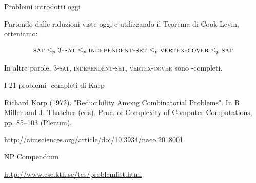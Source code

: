 \begin{frame}{Problemi introdotti oggi}

Partendo dalle riduzioni viste oggi e utilizzando il Teorema di Cook-Levin,
otteniamo:

\[
  \textsc{sat} \leq_p \textsc{3-sat} \leq_p \textsc{independent-set} \leq_p \textsc{vertex-cover} \leq_p \textsc{sat}
\]

\bigskip
In altre parole, \textsc{3-sat}, \textsc{independent-set}, \textsc{vertex-cover}
sono \NP-completi.

\end{frame}


\begin{frame}{I 21 problemi \NP-completi di Karp}

\vspace{-9pt}
\begin{myboxtitle}[Bibliografia]
Richard Karp (1972). "Reducibility Among Combinatorial Problems". In R. Miller and J. Thatcher (eds). Proc. of Complexity of Computer Computations, pp. 85–103 (Plenum).
\end{myboxtitle}

\vspace{-9pt}

\tiny
\vspace{-24pt}
\url{http://aimsciences.org/article/doi/10.3934/naco.2018001}
\end{frame}

\begin{frame}{NP Compendium}

\vspace{-12pt}

\tiny
\url{http://www.csc.kth.se/tcs/problemlist.html}


\end{frame}


